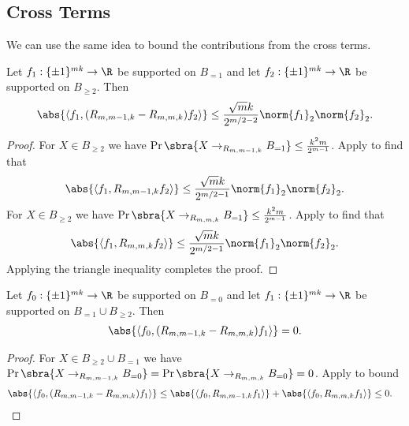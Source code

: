 \subsection{Cross Terms}\label{sec:cross terms}
We can use the same idea to bound the contributions from the cross terms.
\begin{lemma}\label{lem:cross terms B=1 to B=2}
    Let $f_1:\{\pm1\}^{mk}\to\R$ be supported on $B_{=1}$ and let $f_2:\{\pm1\}^{mk}\to\R$ be supported on $B_{\geq 2}$. Then 
    \begin{align*}
        \abs{\left\langle f_1,(R_{m,m-1,k}-R_{m,m,k})f_2\right\rangle} \leq \frac{\sqrt{m}k}{2^{m/2-2}}\norm{f_1}_2\norm{f_2}_2.
    \end{align*}
\end{lemma}
\begin{proof}
    For $X\in B_{\geq 2}$ we have $\Pr\sbra{X\to_{R_{m,m-1,k}} B_{=1}}\leq \frac{k^2m}{2^{m-1}}$. Apply  to find that
    \begin{align*}
        \abs{\left\langle f_1,R_{m,m-1,k}f_2\right\rangle} \leq \frac{\sqrt{m}k}{2^{m/2-1}}\norm{f_1}_2\norm{f_2}_2.
    \end{align*}
    For $X\in B_{\geq 2}$ we have $\Pr\sbra{X\to_{R_{m,m,k}} B_{=1}}\leq \frac{k^2m}{2^{m-1}}$. Apply  to find that
    \begin{align*}
        \abs{\left\langle f_1,R_{m,m,k}f_2\right\rangle} \leq \frac{\sqrt{m}k}{2^{m/2-1}}\norm{f_1}_2\norm{f_2}_2.
    \end{align*}
    Applying the triangle inequality completes the proof.
\end{proof}

\begin{lemma}\label{lem:cross terms B0}
    Let $f_0:\{\pm1\}^{mk}\to\R$ be supported on $B_{=0}$ and let $f_1:\{\pm1\}^{mk}\to\R$ be supported on $B_{=1}\cup B_{\geq 2}$. Then 
    \begin{align*}
        \abs{\left\langle f_0,(R_{m,m-1,k}-R_{m,m,k})f_1\right\rangle} = 0.
    \end{align*}
\end{lemma}
\begin{proof}
    For $X\in B_{\geq 2}\cup B_{=1}$ we have $\Pr\sbra{X\to_{R_{m,m-1,k}} B_{=0}}=\Pr\sbra{X\to_{R_{m,m,k}} B_{=0}}=0$. Apply  to bound 
    \begin{align*}
        &\abs{\left\langle f_0,(R_{m,m-1,k}-R_{m,m,k})f_1\right\rangle} \leq \abs{\left\langle f_0,R_{m,m-1,k}f_1\right\rangle} + \abs{\left\langle f_0,R_{m,m,k}f_1\right\rangle} \leq0.\qedhere
    \end{align*}
\end{proof}

